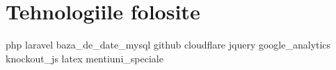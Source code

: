 \chapter{Tehnologiile folosite}
{php}
{laravel}
{baza_de_date_mysql}
{github}
{cloudflare}
{jquery}
{google_analytics}
{knockout_js}
{latex}
{mentiuni_speciale}
